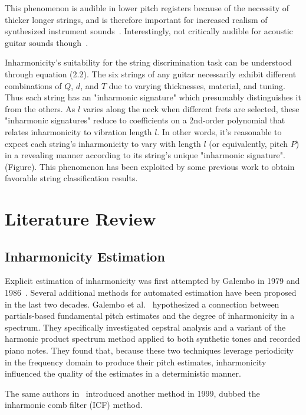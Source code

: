 \documentclass[12pt]{cmuthesis}
\begin{document}
This phenomenon is audible in lower pitch registers because of the necessity of thicker longer strings, and is therefore important for increased realism of synthesized instrument sounds~\cite{jarvalainen2003,fletcher}. Interestingly, not critically audible for acoustic guitar sounds though~\cite{karjalainen}. 

Inharmonicity's suitability for the string discrimination task can be understood through equation (2.2). The six strings of any guitar necessarily exhibit different combinations of $Q$, $d$, and $T$ due to varying thicknesses, material, and tuning. Thus each string has an "inharmonic signature" which presumably distinguishes it from the others. As $l$ varies along the neck when different frets are selected, these "inharmonic signatures" reduce to coefficients on a 2nd-order polynomial that relates inharmonicity to vibration length $l$. In other words, it's reasonable to expect each string's inharmonicity to vary with length $l$ (or equivalently, pitch $P$) in a revealing manner according to its string's unique "inharmonic signature". (Figure). This phenomenon has been exploited by some previous work to obtain favorable string classification results.



\noindent
\chapter{Literature Review}
\section{Inharmonicity Estimation}
Explicit estimation of inharmonicity was first attempted by Galembo in 1979 and 1986~\cite{galembo}. Several additional methods for automated estimation have been proposed in the last two decades. Galembo et al.~\cite{galembo1994} hypothesized a connection between partials-based fundamental pitch estimates and the degree of inharmonicity in a spectrum. They specifically investigated cepstral analysis and a variant of the harmonic product spectrum method applied to both synthetic tones and recorded piano notes. They found that, because these two techniques leverage periodicity in the frequency domain to produce their pitch estimates, inharmonicity influenced the quality of the estimates in a deterministic manner.
 
 The same authors in~\cite{galembo1999} introduced another method in 1999, dubbed the inharmonic comb filter (ICF) method. 
\end{document}

